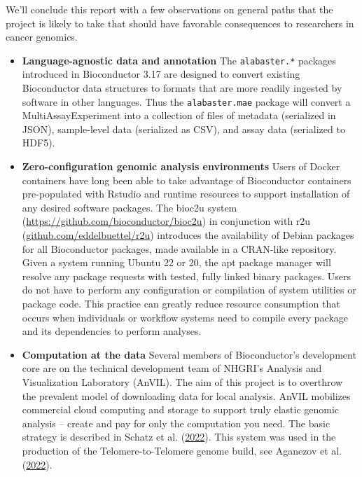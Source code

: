 \documentclass[]{article}
\begin{document}
We'll conclude this report with a few observations on
general paths that the project is likely to take that
should have favorable consequences to researchers in
cancer genomics.

\begin{itemize}
\item
  \textbf{Language-agnostic data and annotation} The \texttt{alabaster.*} packages
  introduced in Bioconductor 3.17 are designed to convert existing
  Bioconductor data structures to formats that are more readily ingested
  by software in other languages. Thus the \texttt{alabaster.mae}
  package will convert a MultiAssayExperiment into a collection
  of files of metadata (serialized in JSON), sample-level data
  (serialized as CSV), and assay data (serialized to HDF5).
\item
  \textbf{Zero-configuration genomic analysis environments} Users
  of Docker containers have long been able to take advantage of
  Bioconductor containers pre-populated with Rstudio and runtime
  resources to support installation of any desired software packages.
  The bioc2u system (\url{https://github.com/bioconductor/bioc2u}) in conjunction
  with r2u (\url{github.com/eddelbuettel/r2u}) introduces the
  availability of Debian packages for all Bioconductor packages,
  made available in a CRAN-like repository. Given a system running
  Ubuntu 22 or 20, the apt package manager will resolve any package
  requests with tested, fully linked binary packages. Users do not
  have to perform any configuration or compilation of system
  utilities or package code. This practice can greatly reduce
  resource consumption that occurs when individuals or
  workflow systems need to compile
  every package and its dependencies to perform analyses.
\item
  \textbf{Computation at the data} Several members of Bioconductor's
  development core are on the technical development team of
  NHGRI's Analysis and Visualization Laboratory (AnVIL). The aim
  of this project is to overthrow the prevalent model of downloading data for
  local analysis. AnVIL mobilizes commercial cloud computing and
  storage to support truly elastic genomic analysis -- create and
  pay for only the computation you need. The basic
  strategy is described in Schatz et al. (\protect\hyperlink{ref-Schatz2022}{2022}). This system was
  used in the production of the Telomere-to-Telomere
  genome build, see Aganezov et al. (\protect\hyperlink{ref-Aganezov2022}{2022}).
\end{itemize}
\end{document}

